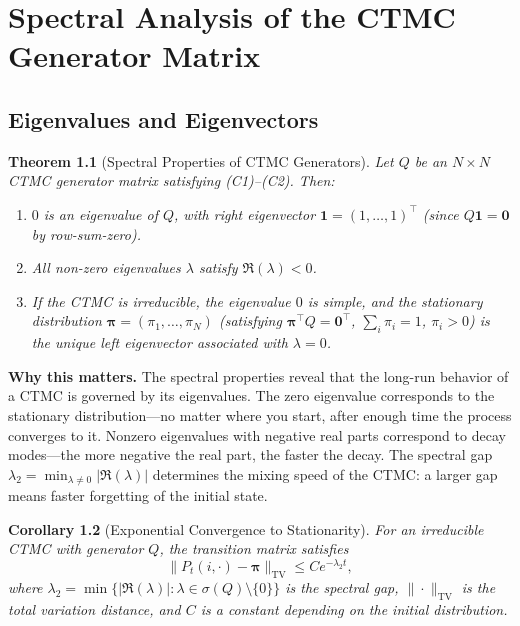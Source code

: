 \documentclass[11pt,a4paper,openany]{book}
\theoremstyle{definition}
\theoremstyle{plain}
\newtheorem{theorem}{Theorem}[chapter]
\newtheorem{corollary}[theorem]{Corollary}
\theoremstyle{remark}
\newcommand{\1}{\mathbbm{1}}
\begin{document}
\chapter{Spectral Analysis of the CTMC Generator Matrix}

\section{Eigenvalues and Eigenvectors}

\begin{theorem}[Spectral Properties of CTMC Generators]
Let $Q$ be an $N \times N$ CTMC generator matrix satisfying (C1)--(C2). Then:
\begin{enumerate}[label=(\arabic*)]
    \item $0$ is an eigenvalue of $Q$, with right eigenvector $\mathbf{1} = (1, \ldots, 1)^{\top}$ (since $Q\mathbf{1} = \mathbf{0}$ by row-sum-zero).
    \item All non-zero eigenvalues $\lambda$ satisfy $\Re(\lambda) < 0$.
    \item If the CTMC is irreducible, the eigenvalue $0$ is simple, and the stationary distribution $\boldsymbol{\pi} = (\pi_{1}, \ldots, \pi_{N})$ (satisfying $\boldsymbol{\pi}^{\top} Q = \mathbf{0}^{\top}$, $\sum_{i} \pi_{i} = 1$, $\pi_{i} > 0$) is the unique left eigenvector associated with $\lambda = 0$.
\end{enumerate}
\end{theorem}

\medskip
\noindent\textbf{Why this matters.} The spectral properties reveal that the long-run behavior of a CTMC is governed by its eigenvalues. The zero eigenvalue corresponds to the stationary distribution---no matter where you start, after enough time the process converges to it. Nonzero eigenvalues with negative real parts correspond to decay modes---the more negative the real part, the faster the decay. The spectral gap $\lambda_2 = \min_{\lambda \neq 0} |\Re(\lambda)|$ determines the mixing speed of the CTMC: a larger gap means faster forgetting of the initial state.

\begin{corollary}[Exponential Convergence to Stationarity]
For an irreducible CTMC with generator $Q$, the transition matrix satisfies
\[
\|P_{t}(i, \cdot) - \boldsymbol{\pi}\|_{\text{TV}} \leq C e^{-\lambda_{2} t},
\]
where $\lambda_{2} = \min\{|\Re(\lambda)| : \lambda \in \sigma(Q) \setminus \{0\}\}$ is the spectral gap, $\|\cdot\|_{\text{TV}}$ is the total variation distance, and $C$ is a constant depending on the initial distribution.
\end{corollary}
\end{document}

